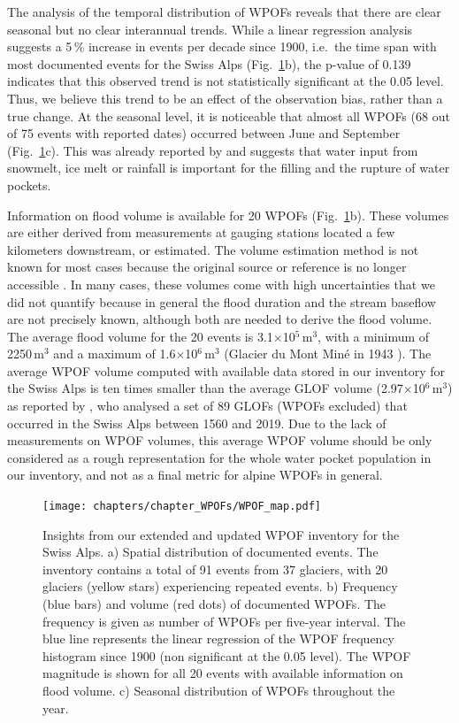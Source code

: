 
The analysis of the temporal distribution of WPOFs reveals that there are clear seasonal but no clear interannual trends. While a linear regression analysis suggests a 5\,\% increase in events per decade since 1900, i.e.\ the time span with most documented events for the Swiss Alps (Fig.~\ref{fig:WPOFs_map}b), the p-value of 0.139 indicates that this observed trend is not statistically significant at the 0.05 level. Thus, we believe this trend to be an effect of the observation bias, rather than a true change. At the seasonal level, it is noticeable that almost all WPOFs (68 out of 75 events with reported dates) occurred between June and September (Fig.~\ref{fig:WPOFs_map}c). This was already reported by \cite{Haeberli1983} and suggests that water input from snowmelt, ice melt or rainfall is important for the filling and the rupture of water pockets. 

Information on flood volume is available for 20 WPOFs (Fig.~\ref{fig:WPOFs_map}b). These volumes are either derived from measurements at gauging stations located a few kilometers downstream, or estimated. The volume estimation method is not known for most cases because the original source or reference is no longer accessible \cite[cf.][]{Haeberli1983}. In many cases, these volumes come with high uncertainties that we did not quantify because in general the flood duration and the stream baseflow are not precisely known, although both are needed to derive the flood volume. The average flood volume for the 20 events is 3.1$\times$10$^5$\,m$^3$, with a minimum of 2250\,m$^3$ and a maximum of 1.6$\times$10$^6$\,m$^3$ (Glacier du Mont Miné in 1943 \citep{Bohorquez&Darby2008}). The average WPOF volume computed with available data stored in our inventory for the Swiss Alps is ten times smaller than the average GLOF volume (2.97$\times$10$^6$\,m$^3$) as reported by \cite{Veh&al2022}, who analysed a set of 89 GLOFs (WPOFs excluded) that occurred in the Swiss Alps between 1560 and 2019. Due to the lack of measurements on WPOF volumes, this average WPOF volume should be only considered as a rough representation for the whole water pocket population in our inventory, and not as a final metric for alpine WPOFs in general.

\begin{figure}
    \centering
    \texttt{[image: chapters/chapter\_WPOFs/WPOF\_map.pdf]}
    \caption{Insights from our extended and updated WPOF inventory for the Swiss Alps. a) Spatial distribution of documented events. The inventory contains a total of 91 events from 37 glaciers, with 20 glaciers (yellow stars) experiencing repeated events. b) Frequency (blue bars) and volume (red dots) of documented WPOFs. The frequency is given as number of WPOFs per five-year interval. The blue line represents the linear regression of the WPOF frequency histogram since 1900 (non significant at the 0.05 level). The WPOF magnitude is shown for all 20 events with available information on flood volume. c) Seasonal distribution of WPOFs throughout the year.}
    \label{fig:WPOFs_map}
\end{figure}



